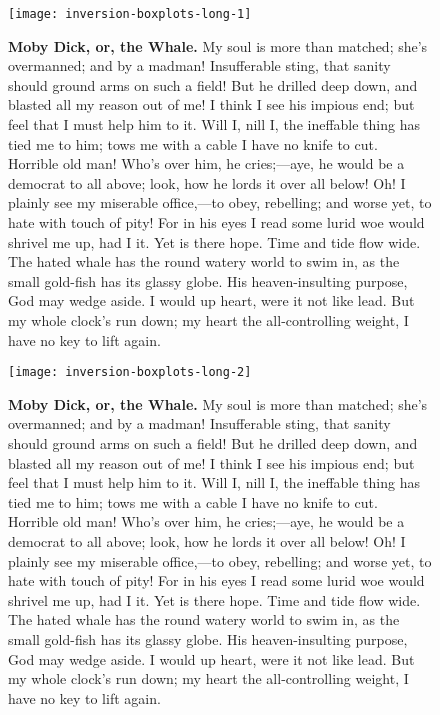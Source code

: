 \documentclass{article}
\begin{document}
\begin{figure}[!htp]
  \begin{center}
      \texttt{[image: inversion-boxplots-long-1]}
    \caption{
        \textbf{Moby Dick, or, the Whale.}
My soul is more than matched; she's overmanned; and by a madman! Insufferable sting, that sanity should ground arms on such a field! But he drilled deep down, and blasted all my reason out of me! I think I see his impious end; but feel that I must help him to it. Will I, nill I, the ineffable thing has tied me to him; tows me with a cable I have no knife to cut. Horrible old man! Who's over him, he cries;—aye, he would be a democrat to all above; look, how he lords it over all below! Oh! I plainly see my miserable office,—to obey, rebelling; and worse yet, to hate with touch of pity! For in his eyes I read some lurid woe would shrivel me up, had I it. Yet is there hope. Time and tide flow wide. The hated whale has the round watery world to swim in, as the small gold-fish has its glassy globe. His heaven-insulting purpose, God may wedge aside. I would up heart, were it not like lead. But my whole clock's run down; my heart the all-controlling weight, I have no key to lift again. 
    }
  \end{center}
\end{figure}

\begin{figure}[!htp]
  \begin{center}
      \texttt{[image: inversion-boxplots-long-2]}
    \caption{
        \textbf{Moby Dick, or, the Whale.}
My soul is more than matched; she's overmanned; and by a madman! Insufferable sting, that sanity should ground arms on such a field! But he drilled deep down, and blasted all my reason out of me! I think I see his impious end; but feel that I must help him to it. Will I, nill I, the ineffable thing has tied me to him; tows me with a cable I have no knife to cut. Horrible old man! Who's over him, he cries;—aye, he would be a democrat to all above; look, how he lords it over all below! Oh! I plainly see my miserable office,—to obey, rebelling; and worse yet, to hate with touch of pity! For in his eyes I read some lurid woe would shrivel me up, had I it. Yet is there hope. Time and tide flow wide. The hated whale has the round watery world to swim in, as the small gold-fish has its glassy globe. His heaven-insulting purpose, God may wedge aside. I would up heart, were it not like lead. But my whole clock's run down; my heart the all-controlling weight, I have no key to lift again. 
    }
  \end{center}
\end{figure}
\end{document}
